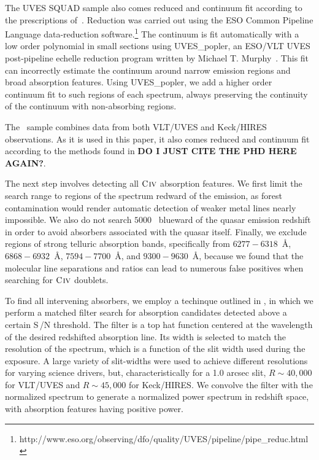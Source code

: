\documentclass[linenumbers,twocolumn]{aastex61}
\begin{document}
The UVES SQUAD sample also comes reduced and continuum fit according to the prescriptions of~\cite{King2012,Bagdonaite2014,Murphy2016,Murphyprep}. Reduction was carried out using the ESO Common Pipeline Language data-reduction software.\footnote{http://www.eso.org/observing/dfo/quality/UVES/pipeline/pipe\_reduc.html} The continuum is fit automatically with a low order polynomial in small sections using UVES\_popler, an ESO/VLT UVES post-pipeline echelle reduction program written by Michael T. Murphy~\citep{MurphyPOPLER}. This fit can incorrectly estimate the continuum around narrow emission regions and broad absorption features. Using UVES\_popler, we add a higher order continuum fit to such regions of each spectrum, always preserving the continuity of the continuum with non-absorbing regions.

The~\cite{EvansThesis} sample combines data from both VLT/UVES and Keck/HIRES observations. As it is used in this paper, it also comes reduced and continuum fit according to the methods found in {\bf DO I JUST CITE THE PHD HERE AGAIN?}.

The next step involves detecting all ${\hbox{{\rm C}\kern 0.1em{\sc iv}}}$ absorption features. We first limit the search range to regions of the spectrum redward of the {\Lya} emission, as {\Lya} forest contamination would render automatic detection of weaker metal lines nearly impossible. We also do not search $5000$~{\kms} blueward of the quasar emission redshift in order to avoid absorbers associated with the quasar itself. Finally, we exclude regions of strong telluric absorption bands, specifically from $6277 - 6318$~{\AA}, $6868 - 6932$~{\AA}, $7594 - 7700$~{\AA}, and $9300 - 9630$~{\AA}, because we found that the molecular line separations and ratios can lead to numerous false positives when searching for ${\hbox{{\rm C}\kern 0.1em{\sc iv}}}$ doublets.

To find all intervening {\CIVdblt} absorbers, we employ a techinque outlined in \cite{Zhu2013}, in which we perform a matched filter search for absorption candidates detected above a certain S\,/N threshold. The filter is a top hat function centered at the wavelength of the desired redshifted absorption line. Its width is selected to match the resolution of the spectrum, which is a function of the slit width used during the exposure. A large variety of slit-widths were used to achieve different resolutions for varying science drivers, but, characteristically for a 1.0 arcsec slit, $R \sim 40,000$ for VLT/UVES and $R \sim 45,000$ for Keck/HIRES. We convolve the filter with the normalized spectrum to generate a normalized power spectrum in redshift space, with absorption features having positive power.
\end{document}
